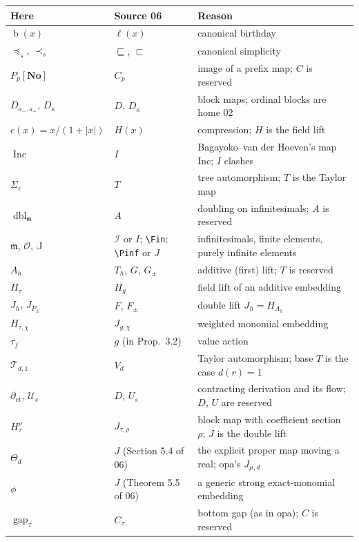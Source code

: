 \documentclass[11pt,a4paper]{article}
\numberwithin{equation}{section}
\theoremstyle{plain}
\theoremstyle{definition}
\theoremstyle{remark}
\newcommand{\No}{\mathbf{No}}
\newcommand{\bday}{\operatorname{b}}
\newcommand{\pref}{\preccurlyeq_s}
\newcommand{\spref}{\prec_s}
\newcommand{\code}[1]{\texttt{\small #1}}
\newcommand{\ctsr}{\operatorname{ct}}%
\newcommand{\gapsr}{\operatorname{gap}}%
\newcommand{\dblsr}{\operatorname{dbl}}%
\newcommand{\Incsr}{\operatorname{Inc}}%
\begin{document}
\begingroup\small
\begin{longtable}{P{38mm}P{38mm}P{72mm}}
\toprule
Here & Source 06 & Reason \\
\midrule
\endhead
$\bday(x)$ & $\ell(x)$ & canonical birthday \\
$\pref$, $\spref$ & $\sqsubseteq$, $\sqsubset$ & canonical simplicity \\
$P_p[\No]$ & $C_p$ & image of a prefix map; $C$ is reserved \\
$D_{a_-,a_+}$, $D_\kappa$ & $D$, $D_\kappa$ & block maps; ordinal blocks are home 02 \\
$c(x)=x/(1+|x|)$ & $H(x)$ & compression; $H$ is the field lift \\
$\Incsr$ & $I$ & Bagayoko--van der Hoeven's map $\mathrm{Inc}$; $I$ clashes \\
$\Sigma_\varepsilon$ & $T$ & tree automorphism; $T$ is the Taylor map \\
$\dblsr_{\mathfrak m}$ & $A$ & doubling on infinitesimals; $A$ is reserved \\
$\mathfrak m$, $\mathcal O$, $\mathbb J$ & $\mathcal I$ or $I$; \code{\textbackslash Fin}; \code{\textbackslash Pinf} or $J$ &infinitesimals, finite elements, purely infinite elements \\
$A_h$ & $T_h$, $G$, $G_\pm$ & additive (first) lift; $T$ is reserved \\
$H_\tau$ & $H_g$ & field lift of an additive embedding \\
$J_h$, $J_{P_\pm}$ & $F$, $F_\pm$ & double lift $J_h=H_{A_h}$ \\
$H_{\tau,\chi}$ & $J_{g,\chi}$ & weighted monomial embedding \\
$\tau_f$ & $g$ (in Prop.~3.2) & value action \\
$\mathcal T_{d,1}$ & $V_d$ & Taylor automorphism; base $T$ is the case $d(r)=1$ \\
$\partial_{\ctsr}$, $\mathcal U_s$ & $D$, $U_s$ & contracting derivation and its flow; $D$, $U$ are reserved \\
$H^{\rho}_{\tau}$ & $J_{\tau,\rho}$ & block map with coefficient section $\rho$; $J$ is the double lift \\
$\Theta_d$ & $J$ (Section 5.4 of 06) & the explicit proper map moving a real; opa's $J_{\mu,d}$ \\
$\phi$ & $J$ (Theorem 5.5 of 06) & a generic strong exact-monomial embedding \\
$\gapsr_\tau$ & $C_\tau$ & bottom gap (as in opa); $C$ is reserved \\

\end{longtable}
\end{document}
